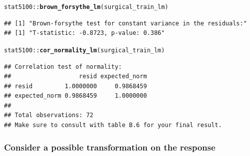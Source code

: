 \documentclass{article}\usepackage[]{graphicx}\usepackage[]{color}
\makeatletter
\newcommand{\hlopt}[1]{\textcolor[rgb]{0,0,0}{#1}}%
\newcommand{\hlstd}[1]{\textcolor[rgb]{0.345,0.345,0.345}{#1}}%
\newcommand{\hlkwd}[1]{\textcolor[rgb]{0.737,0.353,0.396}{\textbf{#1}}}%
\newenvironment{kframe}{%
 \def\at@end@of@kframe{}%
 \ifinner\ifhmode%
  \def\at@end@of@kframe{\end{minipage}}%
  \begin{minipage}{\columnwidth}%
 \fi\fi%
 \def\FrameCommand##1{\hskip\@totalleftmargin \hskip-\fboxsep
 \colorbox{shadecolor}{##1}\hskip-\fboxsep
     \hskip-\linewidth \hskip-\@totalleftmargin \hskip\columnwidth}%
 \MakeFramed {\advance\hsize-\width
   \@totalleftmargin\z@ \linewidth\hsize
   \@setminipage}}%
 {\par\unskip\endMakeFramed%
 \at@end@of@kframe}
\newenvironment{knitrout}{}{} %
\makeatother
\begin{document}
\begin{knitrout}
\begin{kframe}\begin{alltt}
\hlstd{stat5100}\hlopt{::}\hlkwd{brown_forsythe_lm}\hlstd{(surgical_train_lm)}
\end{alltt}
\begin{verbatim}
## [1] "Brown-forsythe test for constant variance in the residuals:"
## [1] "T-statistic: -0.8723, p-value: 0.386"
\end{verbatim}
\begin{alltt}
\hlstd{stat5100}\hlopt{::}\hlkwd{cor_normality_lm}\hlstd{(surgical_train_lm)}
\end{alltt}
\begin{verbatim}
## Correlation test of normality:
##                   resid expected_norm
## resid         1.0000000     0.9868459
## expected_norm 0.9868459     1.0000000
## 
## Total observations: 72
## Make sure to consult with table B.6 for your final result.
\end{verbatim}
\end{kframe}
\end{knitrout}

\subsubsection*{Consider a possible transformation on the response}
\end{document}
